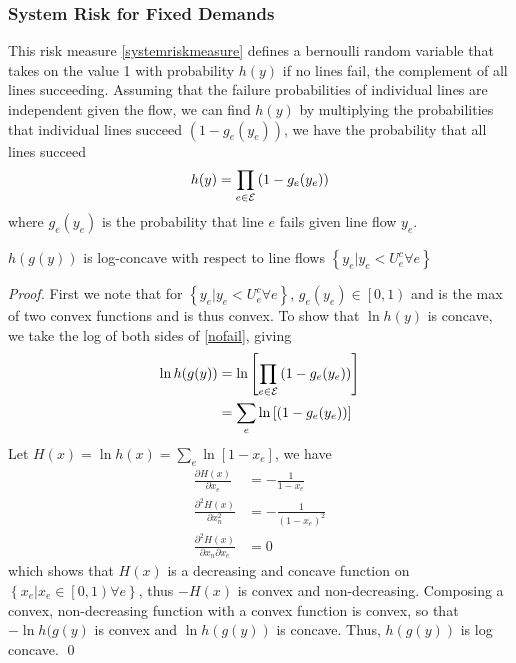 \subsubsection*{System Risk for Fixed Demands}
This risk measure \ref{systemriskmeasure} defines a bernoulli random variable that takes on the value 1 with probability $h(y)$ if no lines fail, the complement of all lines succeeding.  Assuming that the failure probabilities of individual lines are independent given the flow, we can find $h(y)$ by multiplying the probabilities that individual lines succeed $(1-g_e(y_e))$, we have the probability that all lines succeed
\begin{equation}  \label{nofail}
h(y) = \prod_{e \in \mathcal{E}} \left( 1 - g_e(y_e) \right)
\end{equation}  
where $g_e(y_e)$ is the probability that line $e$ fails given line flow $y_e$.   



\begin{lemma}
$h(g(y))$ is log-concave with respect to line flows $\left\{ y_e | y_e < U^c_e \forall e\right\}$
\end{lemma}
\begin{proof}
  First we note that for $\left\{ y_e | y_e < U^c_e \forall e \right\}$,  $g_e(y_e) \in \left[ 0, 1\right)$ and is the max of two convex functions and is thus convex. To show that $\ln h(y)$ is concave, we  take the log of both sides of \ref{nofail}, giving
\begin{align*}
\ln  h(g(y)) & = \ln \left[ \prod_{e \in \mathcal{E}} \left( 1 - g_e(y_e) \right) \right] \\
&= \sum_e \ln \left[ \left( 1 - g_e(y_e) \right)\right]
\end{align*}
Let $H(x) = \ln h(x) = \sum_e \ln \left[ 1- x_e \right]$, we have
\begin{align*}
\frac{\partial H(x)}{\partial x_e} &=  -\frac{1}{1-x_e}  \\
\frac{\partial^2 H(x)}{\partial x_n^2} &=  - \frac{1}{(1-x_e)^2} \\
\frac{\partial^2 H(x)}{\partial x_n \partial x_e} &=  0 
\end{align*}
which shows that $H(x)$ is a decreasing and concave function on $\left\{x_e | x_e \in \left[0,1\right) \forall e \right\}$, thus $-H(x)$ is convex and non-decreasing.  Composing a convex, non-decreasing function with a convex function is convex, so that $-\ln h(g(y)$ is convex and $\ln h(g(y))$ is concave.  Thus, $h(g(y))$ is log concave. \qed
\end{proof}


